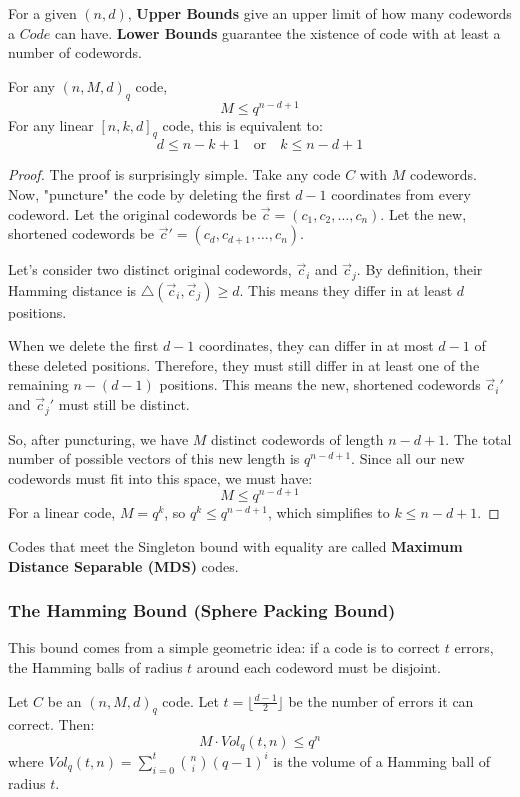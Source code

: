 
For a given $(n, d)$, \textbf{Upper Bounds} give an upper limit of how many codewords a $Code$ can have. \textbf{Lower Bounds} guarantee the xistence of code with at least a number of codewords.

\begin{theorem}
For any $(n, M, d)_q$ code,
\[ M \le q^{n-d+1} \]
For any linear $[n, k, d]_q$ code, this is equivalent to:
\[ d \le n - k + 1 \quad \text{or} \quad k \le n - d + 1 \]
\end{theorem}

\begin{proof}
The proof is surprisingly simple. Take any code $C$ with $M$ codewords. Now, "puncture" the code by deleting the first $d-1$ coordinates from every codeword.
Let the original codewords be $\vec{c} = (c_1, c_2, \dots, c_n)$.
Let the new, shortened codewords be $\vec{c}' = (c_d, c_{d+1}, \dots, c_n)$.

Let's consider two distinct original codewords, $\vec{c}_i$ and $\vec{c}_j$. By definition, their Hamming distance is $\triangle(\vec{c}_i, \vec{c}_j) \ge d$. This means they differ in at least $d$ positions.

When we delete the first $d-1$ coordinates, they can differ in at most $d-1$ of these deleted positions. Therefore, they must still differ in at least one of the remaining $n-(d-1)$ positions. This means the new, shortened codewords $\vec{c}_i'$ and $\vec{c}_j'$ must still be distinct.

So, after puncturing, we have $M$ distinct codewords of length $n-d+1$. The total number of possible vectors of this new length is $q^{n-d+1}$. Since all our new codewords must fit into this space, we must have:
\[ M \le q^{n-d+1} \]
For a linear code, $M=q^k$, so $q^k \le q^{n-d+1}$, which simplifies to $k \le n-d+1$.
\end{proof}
Codes that meet the Singleton bound with equality are called \textbf{Maximum Distance Separable (MDS)} codes.

\subsubsection{The Hamming Bound (Sphere Packing Bound)}

This bound comes from a simple geometric idea: if a code is to correct $t$ errors, the Hamming balls of radius $t$ around each codeword must be disjoint.

\begin{theorem}
Let $C$ be an $(n, M, d)_q$ code. Let $t = \lfloor \frac{d-1}{2} \rfloor$ be the number of errors it can correct. Then:
\[ M \cdot Vol_q(t, n) \le q^n \]
where $Vol_q(t, n) = \sum_{i=0}^t \binom{n}{i}(q-1)^i$ is the volume of a Hamming ball of radius $t$.
\end{theorem}

